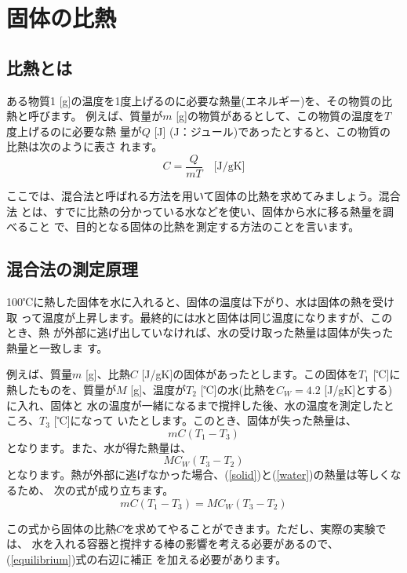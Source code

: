 %
%


\section{固体の比熱}

\subsection{比熱とは}

ある物質1 [g]の温度を1度上げるのに必要な熱量(エネルギー)を、その物質の比熱と呼びます。 
例えば、質量が$m$ [g]の物質があるとして、この物質の温度を$T$度上げるのに必要な熱 
量が$Q$ [J] (J：ジュール)であったとすると、この物質の比熱は次のように表さ 
れます。
\[
C=\frac{Q}{m T} \quad \text{[J/gK]}
\]

ここでは、混合法と呼ばれる方法を用いて固体の比熱を求めてみましょう。混合法 
とは、すでに比熱の分かっている水などを使い、固体から水に移る熱量を調べること 
で、目的となる固体の比熱を測定する方法のことを言います。


\subsection{混合法の測定原理}

100℃に熱した固体を水に入れると、固体の温度は下がり、水は固体の熱を受け取 
って温度が上昇します。最終的には水と固体は同じ温度になりますが、このとき、熱 
が外部に逃げ出していなければ、水の受け取った熱量は固体が失った熱量と一致しま 
す。

例えば、質量$m$ [g]、比熱$C$ [J/gK]の固体があったとします。この固体を$T_1$ [℃]に 
熱したものを、質量が$M$ [g]、温度が$T_2$ [℃]の水(比熱を$C_W=4.2$ [J/gK]とする)に入れ、固体と 
水の温度が一緒になるまで撹拌した後、水の温度を測定したところ、$T_3$ [℃]になって 
いたとします。このとき、固体が失った熱量は、
\begin{equation}
m C (T_1-T_3)
\label{solid}
\end{equation}
となります。また、水が得た熱量は、
\begin{equation}
M C_W (T_3-T_2)
\label{water}
\end{equation}
となります。熱が外部に逃げなかった場合、(\ref{solid})と(\ref{water})の熱量は等しくなるため、 
次の式が成り立ちます。
\begin{equation}
m C (T_1-T_3) = M C_W (T_3-T_2)
\label{equilibrium}
\end{equation}

この式から固体の比熱$C$を求めてやることができます。ただし、実際の実験では、
水を入れる容器と撹拌する棒の影響を考える必要があるので、(\ref{equilibrium})式の右辺に補正 
を加える必要があります。

